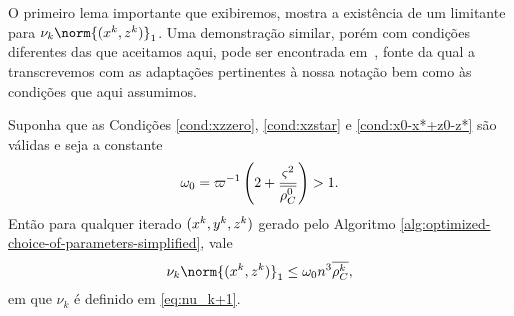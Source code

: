 
O primeiro lema importante que exibiremos, mostra a existência de um limitante para $\nu_k\norm{(\xk,\zk)}_{1}$. Uma demonstração similar, porém com condições diferentes das que aceitamos aqui, pode ser encontrada em~\cite[Lema 6.1]{Wright:Primal-dual-interior-point:1997h}, fonte da qual a transcrevemos com as adaptações pertinentes à nossa notação bem como às condições que aqui assumimos.




\begin{lema}\label{lemma:boundxz1}
	Suponha que as Condições \ref{cond:xzzero}, \ref{cond:xzstar} e \ref{cond:x0-x*+z0-z*} são válidas e seja a constante 
	\begin{equation}\label{eq:omega-0}
		\omega_{0} = \varpi^{-1}\left(2  + \dfrac{\varsigma^{2}}{\overline{\rho_C^{0}}}\right) >1.
		\end{equation} 
	 Então para qualquer iterado $(x^{k},y^{k},z^{k})$ gerado pelo Algoritmo \ref{alg:optimized-choice-of-parameters-simplified}, vale
	\begin{equation}
		\label{eq:bound-xkzk}
		\nu_k\norm{(\xk,\zk)}_{1} \leq  \omega_{0} n^{3} \dbvec{\rho_C^{k}},
	\end{equation}
	em que $\nu_k$ é definido em \eqref{eq:nu_k+1}.
\end{lema}

